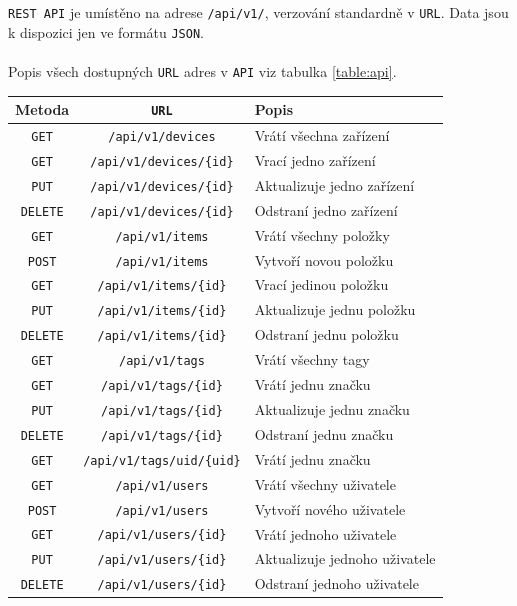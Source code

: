 \documentclass[czech,BP]{thesiskiv}
\begin{document}
		\texttt{REST API} je umístěno na adrese \texttt{/api/v1/}, verzování standardně v \texttt{URL}. Data jsou k dispozici jen ve formátu \texttt{JSON}. 
		\\\\
Popis všech dostupných \texttt{URL} adres v \texttt{API} viz tabulka \ref{table:api}.
\begin{table}[H]
\centering
\begin{tabular}{ c | c | p{6cm}}
\textbf{Metoda} & \textbf{ \texttt{URL}} & \textbf{Popis} \\ \hline\hline
 	
\texttt{GET} & \texttt{/api/v1/devices} & Vrátí všechna zařízení \\ \hline  
\texttt{GET} & \texttt{/api/v1/devices/\{id\}} & Vrací jedno zařízení \\ \hline
\texttt{PUT} & \texttt{/api/v1/devices/\{id\}} & Aktualizuje jedno zařízení \\ \hline
\texttt{DELETE} & \texttt{/api/v1/devices/\{id\}} & Odstraní jedno zařízení  \\ \hline

\texttt{GET} & \texttt{/api/v1/items} & Vrátí všechny položky \\ \hline
\texttt{POST} & \texttt{/api/v1/items} & Vytvoří novou položku \\ \hline
\texttt{GET} & \texttt{/api/v1/items/\{id\}} & Vrací jedinou položku \\ \hline
\texttt{PUT} & \texttt{/api/v1/items/\{id\}} & Aktualizuje jednu položku \\ \hline
\texttt{DELETE} & \texttt{/api/v1/items/\{id\}} & Odstraní jednu položku \\ \hline

\texttt{GET} & \texttt{/api/v1/tags} & Vrátí všechny tagy  \\ \hline
\texttt{GET} & \texttt{/api/v1/tags/\{id\}} & Vrátí jednu značku \\ \hline
\texttt{PUT} & \texttt{/api/v1/tags/\{id\}} & Aktualizuje jednu značku \\ \hline
\texttt{DELETE} & \texttt{/api/v1/tags/\{id\}} & Odstraní jednu značku \\ \hline
\texttt{GET} & \texttt{/api/v1/tags/uid/\{uid\}} & Vrátí jednu značku \\ \hline

\texttt{GET} & \texttt{/api/v1/users} & Vrátí všechny uživatele \\ \hline
\texttt{POST} & \texttt{/api/v1/users} & Vytvoří nového uživatele \\ \hline
\texttt{GET} & \texttt{/api/v1/users/\{id\}} & Vrátí jednoho uživatele \\ \hline
\texttt{PUT} & \texttt{/api/v1/users/\{id\}} & Aktualizuje jednoho uživatele \\ \hline
\texttt{DELETE} & \texttt{/api/v1/users/\{id\}} & Odstraní jednoho uživatele \\ \hline


\end{tabular}
\end{table}
\end{document}
